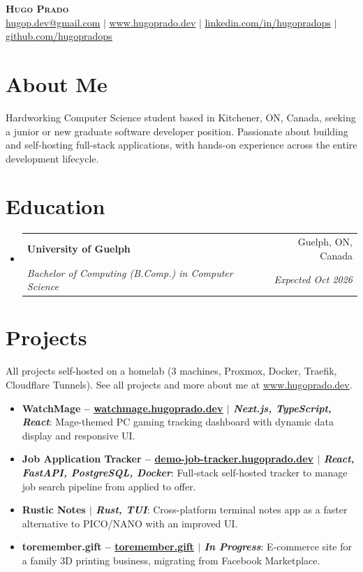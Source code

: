 \documentclass[letterpaper,11pt]{article}
\makeatletter
\newcommand{\resumeItem}[2]{
  \item\small{
    \textbf{#1}{: #2 \vspace{-2pt}}
  }
}
\newcommand{\resumeSubheading}[4]{
  \vspace{-1pt}\item
    \begin{tabular*}{0.97\textwidth}[t]{l@{\extracolsep{\fill}}r}
      \textbf{#1} & #2 \\
      \textit{\small#3} & \textit{\small #4} \\
    \end{tabular*}\vspace{-5pt}
}
\newcommand{\resumeSubItem}[2]{\resumeItem{#1}{#2}\vspace{-4pt}}
\newcommand{\resumeSubHeadingListStart}{\begin{itemize}[leftmargin=*]}
\newcommand{\resumeSubHeadingListEnd}{\end{itemize}}
\makeatother
\begin{document}
\begin{center}
  \textbf{\color{myblue} \Huge \scshape Hugo Prado} \\ \vspace{1pt}
  \small
  \href{mailto:hugop.dev@gmail.com}{\underline{hugop.dev@gmail.com}} $|$
  \href{https://www.hugoprado.dev}{\underline{www.hugoprado.dev}} $|$
  \href{https://www.linkedin.com/in/hugopradops/}{\underline{linkedin.com/in/hugopradops}} $|$
  \href{https://github.com/hugopradops}{\underline{github.com/hugopradops}}
\end{center}

\section{About Me}
  \small{Hardworking Computer Science student based in Kitchener, ON, Canada, seeking a junior or new graduate software developer position. Passionate about building and self-hosting full-stack applications, with hands-on experience across the entire development lifecycle.}

\section{Education}
  \resumeSubHeadingListStart
    \resumeSubheading
      {University of Guelph}{Guelph, ON, Canada}
      {Bachelor of Computing (B.Comp.) in Computer Science}{Expected Oct 2026}
  \resumeSubHeadingListEnd

\section{Projects}
  \small{All projects self-hosted on a homelab (3 machines, Proxmox, Docker, Traefik, Cloudflare Tunnels). See all projects and more about me at \href{https://www.hugoprado.dev}{\underline{www.hugoprado.dev}}.}
  \vspace{-2pt}
  \resumeSubHeadingListStart
    \resumeSubItem{WatchMage \textnormal{-- \href{https://watchmage.hugoprado.dev}{\underline{watchmage.hugoprado.dev}}} \textnormal{$|$ \emph{Next.js, TypeScript, React}}}{Mage-themed PC gaming tracking dashboard with dynamic data display and responsive UI.}
    \resumeSubItem{Job Application Tracker \textnormal{-- \href{https://demo-job-tracker.hugoprado.dev}{\underline{demo-job-tracker.hugoprado.dev}}} \textnormal{$|$ \emph{React, FastAPI, PostgreSQL, Docker}}}{Full-stack self-hosted tracker to manage job search pipeline from applied to offer.}
    \resumeSubItem{Rustic Notes \textnormal{$|$ \emph{Rust, TUI}}}{Cross-platform terminal notes app as a faster alternative to PICO/NANO with an improved UI.}
    \resumeSubItem{toremember.gift \textnormal{-- \href{https://www.toremember.gift}{\underline{toremember.gift}}} \textnormal{$|$ \emph{In Progress}}}{E-commerce site for a family 3D printing business, migrating from Facebook Marketplace.}
  \resumeSubHeadingListEnd
\end{document}
